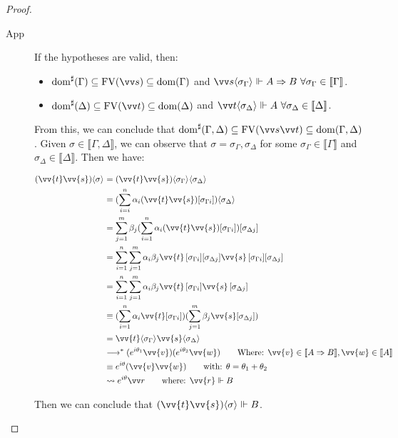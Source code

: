 \documentclass[runningheads,orivec,envcountsame,envcountsect]{llncs}
\newcommand\lra{\longrightarrow}
\newcommand\ansubst[2]{\ensuremath{\langle #1 \rangle_{#2}}}
\newcommand\dom[1]{\mathrm{dom}(#1)}
\newcommand\sdom[1]{\mathrm{dom}^{\sharp}(#1)}
\newcommand\FV[1]{\mathrm{FV}(#1)}
\def\lraneq{\rightsquigarrow}
\def\eval{\lra^*}
\def\Arr{\Rightarrow}
\def\sem#1{\llbracket#1\rrbracket}
\def\real{\Vdash}
\begin{document}
\begin{proof}
\begin{description}
    \item[App] If the hypotheses are valid, then:
    \begin{itemize}
        \item $\sdom{\Gamma}\subseteq \FV{\vv s}\subseteq \dom{\Gamma}$ and $\vv s \ansubst{\sigma_\Gamma}{}\Vdash A\Arr B\ \forall \sigma_\Gamma\in\sem{\Gamma}$.
        \item $\sdom{\Delta}\subseteq \FV{\vv t}\subseteq \dom{\Delta}$ and $\vv t\ansubst{\sigma_\Delta}{}\Vdash A\ \forall\sigma_\Delta\in\sem{\Delta}$.
    \end{itemize}
    
    From this, we can conclude that $\sdom{\Gamma,\Delta}\subseteq \FV{\vv s \vv t}\subseteq \dom{\Gamma,\Delta}$. Given $\sigma\in\sem{\Gamma,\Delta}$, we can observe that $\sigma=\sigma_\Gamma,\sigma_\Delta$ for some $\sigma_\Gamma\in\sem{\Gamma}$ and $\sigma_\Delta\in\sem{\Delta}$. Then we have:
    
    \begin{align*}
        (\vv{t}\vv{s})\ansubst{\sigma}{} &= (\vv{t}\vv{s})\ansubst{\sigma_\Gamma}{}\ansubst{\sigma_\Delta}{}\\
        &=(\sum_{i=i}^{n}\alpha_i (\vv{t}\vv{s})[\sigma_{\Gamma i}])\ansubst{\sigma_\Delta}{}\\
        &=\sum_{j=1}^{m} \beta_j (\sum_{i=1}^{n} \alpha_i (\vv{t} \vv{s})[\sigma_{\Gamma i}])[\sigma_{\Delta j}]\\
        &=\sum_{i=1}^{n}\sum_{j=1}^{m} \alpha_i \beta_j \vv{t}\,[\sigma_{\Gamma i}][\sigma_{\Delta j}] \vv{s}\,[\sigma_{\Gamma i}][\sigma_{\Delta j}]\\
        &=\sum_{i=1}^{n}\sum_{j=1}^{m} \alpha_i \beta_j \vv{t}\,[\sigma_{\Gamma i}]\vv{s}\,[\sigma_{\Delta j}]\\
        &\equiv (\sum_{i=1}^{n}\alpha_i\vv{t}[\sigma_{\Gamma i}])(\sum_{j=1}^{m} \beta_j \vv{s}[\sigma_{\Delta j}])\\
        &=\vv{t}\ansubst{\sigma_\Gamma}{} \vv{s}\ansubst{\sigma_\Delta}{}\\
        &\eval (e^{i\theta_{1}} \vv{v}) (e^{i\theta_{2}} \vv{w})\qquad\text{Where: } \vv{v}\in\sem{A\Arr B}, \vv{w}\in\sem{A}\\
        &\equiv e^{i\theta} (\vv{v} \vv{w})\qquad\text{with: }\theta=\theta_1 + \theta_2\\
        &\lraneq e^{i\theta}\vv r\qquad\text{where: } \vv{r}\real B
    \end{align*}
    
    Then we can conclude that $(\vv{t}\vv{s})\ansubst{\sigma}{}\real B$.
    

\end{description}
\end{proof}
\end{document}
